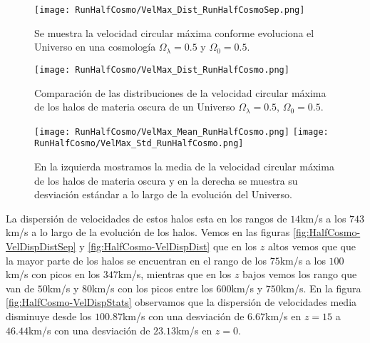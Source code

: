 \begin{figure}[H]
    \centering
    \texttt{[image: RunHalfCosmo/VelMax\_Dist\_RunHalfCosmoSep.png]}
    \caption[Velocidad circular máxima en la evolución de un Universo $\Omega_\lambda = 0.5 $, $\Omega_0 = 0.5$]{\footnotesize Se muestra la velocidad circular máxima conforme evoluciona el Universo en una cosmología $\Omega_\lambda = 0.5 $ y $\Omega_0 = 0.5$.}
    \label{fig:HalfCosmo-VelMaxDistSep}
\end{figure}

\begin{figure}[H]
    \centering
    \texttt{[image: RunHalfCosmo/VelMax\_Dist\_RunHalfCosmo.png]}
    \caption[Distribución de la velocidad circular máxima de un Universo $\Omega_\lambda = 0.5 $, $\Omega_0 = 0.5$]{\footnotesize Comparación de las distribuciones de la velocidad circular máxima de los halos de materia oscura de un Universo $\Omega_\lambda = 0.5 $, $\Omega_0 = 0.5$.}
    \label{fig:HalfCosmo-VelMaxDist}
\end{figure}

\begin{figure}[H]
    \centering
    \texttt{[image: RunHalfCosmo/VelMax\_Mean\_RunHalfCosmo.png]}
    \texttt{[image: RunHalfCosmo/VelMax\_Std\_RunHalfCosmo.png]}
    \caption[Media y desviación estándar de la velocidad circular máxima de un Universo $\Omega_\lambda = 0.5 $, $\Omega_0 = 0.5$]{\footnotesize En la izquierda mostramos la media de la velocidad circular máxima de los halos de materia oscura y en la derecha se muestra su desviación estándar a lo largo de la evolución del Universo.}
    \label{fig:HalfCosmo-VelMaxStats}
\end{figure}

La dispersión de velocidades de estos halos esta en los rangos de $14$km/s a los $743$km/s a lo largo de la evolución de los halos. Vemos en las figuras \ref{fig:HalfCosmo-VelDispDistSep} y \ref{fig:HalfCosmo-VelDispDist} que en los $z$ altos vemos que que la mayor parte de los halos se encuentran en el rango de los $75$km/s a los $100$km/s con picos en los $347$km/s, mientras que en los $z$ bajos vemos los rango que van de $50$km/s y $80$km/s con los picos entre los $600$km/s y $750$km/s. En la figura \ref{fig:HalfCosmo-VelDispStats} observamos que la dispersión de velocidades media disminuye desde los $100.87$km/s con una desviación de $6.67$km/s en $z=15$ a $46.44$km/s con una desviación de $23.13$km/s en $z=0$.

